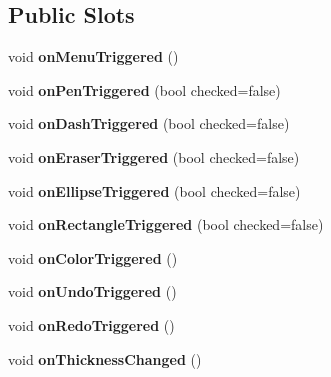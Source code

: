 \subsection*{Public Slots}
\begin{DoxyCompactItemize}
\item 
\hypertarget{classToolBar_a6f41a5cc69289e2effe2e4c7deef29a5}{}void {\bfseries on\+Menu\+Triggered} ()\label{classToolBar_a6f41a5cc69289e2effe2e4c7deef29a5}

\item 
\hypertarget{classToolBar_aec3695607d61c420f4b4d701986205f0}{}void {\bfseries on\+Pen\+Triggered} (bool checked=false)\label{classToolBar_aec3695607d61c420f4b4d701986205f0}

\item 
\hypertarget{classToolBar_a3a6507eca8ad1d40d196f4eccd927c34}{}void {\bfseries on\+Dash\+Triggered} (bool checked=false)\label{classToolBar_a3a6507eca8ad1d40d196f4eccd927c34}

\item 
\hypertarget{classToolBar_aa06280529e9b75b480a20e36bd413188}{}void {\bfseries on\+Eraser\+Triggered} (bool checked=false)\label{classToolBar_aa06280529e9b75b480a20e36bd413188}

\item 
\hypertarget{classToolBar_ab5c0d534826366ad9ddd4954792a1360}{}void {\bfseries on\+Ellipse\+Triggered} (bool checked=false)\label{classToolBar_ab5c0d534826366ad9ddd4954792a1360}

\item 
\hypertarget{classToolBar_ac4b6e4c7dc5e08c2396d37cf454a461b}{}void {\bfseries on\+Rectangle\+Triggered} (bool checked=false)\label{classToolBar_ac4b6e4c7dc5e08c2396d37cf454a461b}

\item 
\hypertarget{classToolBar_a18e54e6bdc681b59bb5389224bbb4844}{}void {\bfseries on\+Color\+Triggered} ()\label{classToolBar_a18e54e6bdc681b59bb5389224bbb4844}

\item 
\hypertarget{classToolBar_a4c159e8c89fef004b60a51bb63fdc007}{}void {\bfseries on\+Undo\+Triggered} ()\label{classToolBar_a4c159e8c89fef004b60a51bb63fdc007}

\item 
\hypertarget{classToolBar_a7e875e0c83f2b11fd14a7b06c325d8ed}{}void {\bfseries on\+Redo\+Triggered} ()\label{classToolBar_a7e875e0c83f2b11fd14a7b06c325d8ed}

\item 
\hypertarget{classToolBar_a2e6ea2a6206cdb883bfb9b508acdfa45}{}void {\bfseries on\+Thickness\+Changed} ()\label{classToolBar_a2e6ea2a6206cdb883bfb9b508acdfa45}

\end{DoxyCompactItemize}
